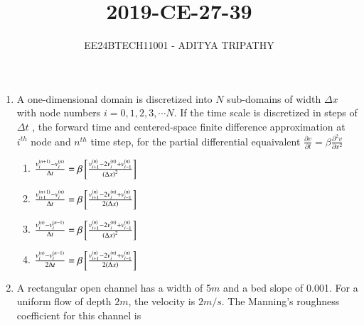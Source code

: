 \documentclass[journal,12pt,onecolumn]{IEEEtran}
\theoremstyle{remark}
\begin{document}

\vspace{3cm}

\title{2019-CE-27-39}
\author{EE24BTECH11001 -  ADITYA TRIPATHY}
\maketitle

\renewcommand{\thefigure}{\theenumi}
\renewcommand{\thetable}{\theenumi}

\begin{enumerate}
    \item 
        A one-dimensional domain is discretized into $N$ sub-domains of width $\Delta x$ with node
        numbers $i = 0, 1, 2, 3, \cdots N$. If the time scale is discretized in steps of $\Delta t$
        , the forward time and centered-space finite difference approximation at $i^{th}$ node and
        $n^{th}$ time step, for the partial differential equaivalent 
        $\frac{\partial v}{\partial t} = \beta \frac{\partial ^2 v}{\partial x^2}$
        
        \hfill{}
        \begin{enumerate}
                \item $\frac{v_i ^{\left(n+1\right)} - v_i ^{\left(n\right)}}{\Delta t} = \beta {}\left[\frac{v_{i+1}^{\left(n\right)} - 2v_i ^{\left(n\right)} + v_{i-1}^{\left(n\right)}}{\left(\Delta x\right)^2}\right]$
                \item $\frac{v_{i+1} ^{\left(n+1\right)} - v_i ^{\left(n\right)}}{\Delta t} = \beta {}\left[\frac{v_{i+1}^{\left(n\right)} - 2v_i ^{\left(n\right)} + v_{i-1}^{\left(n\right)}}{2\left(\Delta x\right)}\right]$
                \item $\frac{v_i ^{\left(n\right)} - v_i ^{\left(n-1\right)}}{\Delta t} = \beta {}\left[\frac{v_{i+1}^{\left(n\right)} - 2v_i ^{\left(n\right)} + v_{i-1}^{\left(n\right)}}{\left(\Delta x\right)^2}\right]$
                \item $\frac{v_i ^{\left(n\right)} - v_i ^{\left(n-1\right)}}{2\Delta t} = \beta {}\left[\frac{v_{i+1}^{\left(n\right)} - 2v_i ^{\left(n\right)} + v_{i-1}^{\left(n\right)}}{2\left(\Delta x\right)}\right]$
            \end{enumerate}
    \item A rectangular open channel has a width of 5$m$ and a bed slope of 0.001. For a uniform
        flow of depth $2m$, the velocity is $2m/s$. The Manning's roughness coefficient for this channel
        is


\end{enumerate}
\end{document}

